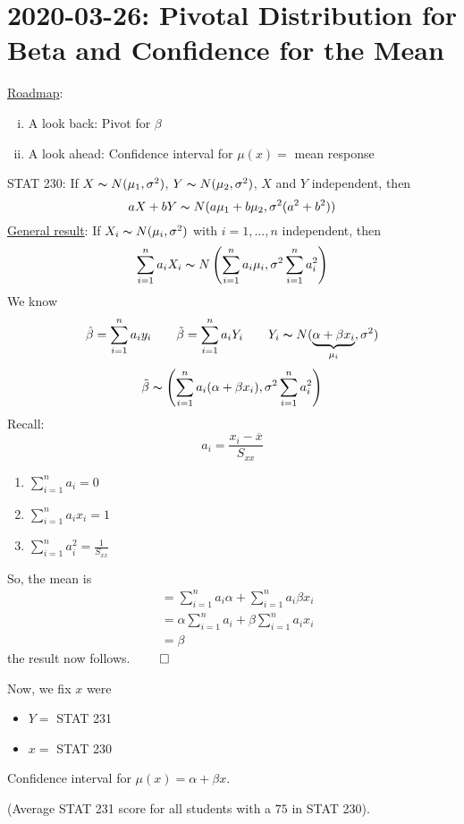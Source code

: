 \section{2020-03-26: Pivotal Distribution for Beta and Confidence for the Mean}
\underline{Roadmap}:
\begin{enumerate}[(i)]
    \item A look back: Pivot for $ \beta $
    \item A look ahead: Confidence interval for $ \mu(x)= $ mean response
\end{enumerate}
STAT 230: If $ X \thicksim N(\mu_1, \sigma^2) $, $ Y \thicksim N(\mu_2,\sigma^2) $,
$ X $ and $ Y $ independent, then
\[ aX+bY \thicksim N(a\mu_1+b\mu_2,\sigma^2(a^2+b^2)) \]
\underline{General result}: If $ X_i \thicksim N(\mu_i,\sigma^2) $
with $ i=1,\ldots ,n $ independent, then
\[ \sum\limits_{i=1}^{n} a_iX_i \thicksim N\left(\sum\limits_{i=1}^{n} a_i\mu_i,
    \sigma^2 \sum\limits_{i=1}^{n} a_i^2\right) \]
We know
\[ \hat{\beta}=\sum\limits_{i=1}^{n} a_iy_i\qquad
    \tilde{\beta}=\sum\limits_{i=1}^{n} a_iY_i\qquad
    Y_i \thicksim N(\underbrace{\alpha+\beta x_i}_{\mu_i},\sigma^2) \]
\[ \tilde{\beta} \thicksim \left( \sum\limits_{i=1}^{n} a_i(\alpha+\beta x_i),
    \sigma^2 \sum\limits_{i=1}^{n} a_i^2 \right) \]
Recall:
\[ a_i=\frac{x_i-\overline{x}}{S_{xx}}  \]
\begin{enumerate}
    \item $ \sum\limits_{i=1}^{n} a_i=0 $
    \item $ \sum\limits_{i=1}^{n} a_ix_i=1 $
    \item $ \sum\limits_{i=1}^{n} a_i^2= \frac{1}{S_{xx}} $
\end{enumerate}
So, the mean is
\begin{align*}
     & =\sum\limits_{i=1}^{n} a_i\alpha+\sum\limits_{i=1}^{n} a_i\beta x_i     \\
     & =\alpha \sum\limits_{i=1}^{n} a_i + \beta \sum\limits_{i=1}^{n} a_i x_i \\
     & =\beta
\end{align*}
the result now follows.
$ \qed $

Now, we fix $ x $ were
\begin{itemize}
    \item $ Y= $ STAT 231
    \item $ x= $ STAT 230
\end{itemize}
Confidence interval for $ \mu(x)=\alpha+\beta x $.

(Average STAT 231 score for all students with a $ 75 $ in STAT 230).

